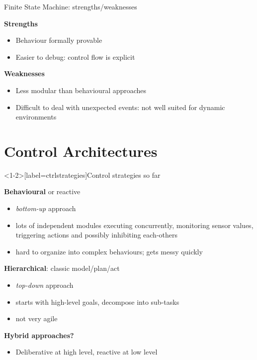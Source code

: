 \documentclass[compress]{beamer}
\begin{document}
\begin{frame}{Finite State Machine: strengths/weaknesses}

    {\bf Strengths}

    \begin{itemize}
        \item Behaviour formally provable
        \item Easier to debug: control flow is explicit
    \end{itemize}

    {\bf Weaknesses}

    \begin{itemize}
        \item Less modular than behavioural approaches
        \item Difficult to deal with unexpected events: not well suited for dynamic environments
    \end{itemize}


\end{frame}



\section{Control Architectures}

\begin{frame}<1-2>[label=ctrlstrategies]{Control strategies so far}

    {\bf Behavioural} or reactive

    \begin{itemize}
        \item \emph{bottom-up} approach
        \item lots of independent modules executing concurrently,
            monitoring sensor values, triggering actions and possibly inhibiting each-others
        \item hard to organize into complex behaviours; gets messy quickly
    \end{itemize}

    \pause

    {\bf Hierarchical}: classic model/plan/act

    \begin{itemize}
        \item \emph{top-down} approach
        \item starts with high-level goals, decompose into sub-tasks
        \item not very agile
    \end{itemize}

    \pause

    {\bf Hybrid approaches?}

    \begin{itemize}
        \item Deliberative at high level, reactive at low level
    \end{itemize}

\end{frame}
\end{document}
